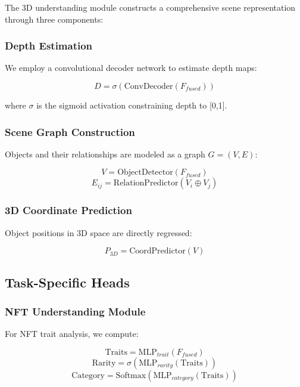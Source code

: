 \documentclass[11pt,a4paper]{article}
\begin{document}
The 3D understanding module constructs a comprehensive scene representation through three components:

\subsubsection{Depth Estimation}
We employ a convolutional decoder network to estimate depth maps:

\begin{equation}
    D = \sigma(\text{ConvDecoder}(F_{fused}))
\end{equation}

where $\sigma$ is the sigmoid activation constraining depth to [0,1].

\subsubsection{Scene Graph Construction}
Objects and their relationships are modeled as a graph $G = (V, E)$:

\begin{equation}
    V = \text{ObjectDetector}(F_{fused})
\end{equation}
\begin{equation}
    E_{ij} = \text{RelationPredictor}(V_i \oplus V_j)
\end{equation}

\subsubsection{3D Coordinate Prediction}
Object positions in 3D space are directly regressed:

\begin{equation}
    P_{3D} = \text{CoordPredictor}(V)
\end{equation}

\subsection{Task-Specific Heads}

\subsubsection{NFT Understanding Module}
For NFT trait analysis, we compute:

\begin{equation}
    \text{Traits} = \text{MLP}_{trait}(F_{fused})
\end{equation}
\begin{equation}
    \text{Rarity} = \sigma(\text{MLP}_{rarity}(\text{Traits}))
\end{equation}
\begin{equation}
    \text{Category} = \text{Softmax}(\text{MLP}_{category}(\text{Traits}))
\end{equation}
\end{document}
